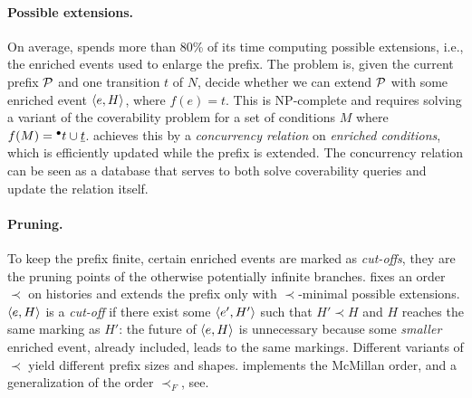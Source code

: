 \documentclass[a4paper]{refart}
\begin{document}

\paragraph{Possible extensions.}
On average, \cunf{} spends more than 80\% of its time 
computing possible extensions,
i.e., the enriched events used to enlarge the prefix.
The problem is, given the current prefix $\mathcal{P}$ and one
transition $t$ of $N$, decide whether we can extend $\mathcal{P}$ with some enriched
event $\langle e, H\rangle$, where $f (e) = t$.  This is NP-complete and
requires solving a variant of the
coverability problem for a set of conditions $M$ where $f (M) = {}^\bullet t \cup
\underline{t}$.  \cunf{} achieves this by a \emph{concurrency relation} on
\emph{enriched conditions}\cite{RSB11a}, which is
efficiently updated while the prefix is extended.
The concurrency relation can be seen as a database that serves
to both solve coverability queries and update the relation itself.

\paragraph{Pruning.}
To keep the prefix finite, certain enriched events are marked as
\emph{cut-offs}, they are the pruning points of the otherwise potentially
infinite branches.
\cunf{} fixes an order $\prec$ on histories 
and extends the prefix only with $\prec$-minimal possible
extensions.
$\langle e, H\rangle$ is a \emph{cut-off} if there exist some $\langle e', H'\rangle$ such
that $H' \prec H$ and $H$ reaches the same marking as $H'$: 
the future of $\langle e, H\rangle$ is unnecessary
because some \emph{smaller} enriched event, already included, leads to the same
markings.
Different variants of $\prec$ yield different prefix sizes and shapes.
\cunf{} implements the McMillan order\cite{McM92}, and a generalization of the
order $\prec_F$, see\cite{ERV02}.
\end{document}
